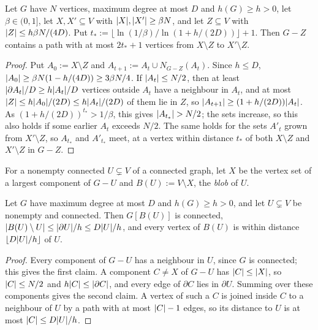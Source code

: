 \begin{lemma}\label{lem:connector}
Let $G$ have $N$ vertices, maximum degree at most $D$ and $h(G)\ge h>0$, let $\beta\in(0,1]$, let $X,X'\subseteq V$ with $\lvert X\rvert,\lvert X'\rvert\ge\beta N$, and let $Z\subseteq V$ with $\lvert Z\rvert\le h\beta N/(4D)$. Put $t_*:=\lfloor\ln(1/\beta)/\ln(1+h/(2D))\rfloor+1$. Then $G-Z$ contains a path with at most $2t_*+1$ vertices from $X\setminus Z$ to $X'\setminus Z$.
\end{lemma}

\begin{proof}
Put $A_0:=X\setminus Z$ and $A_{t+1}:=A_t\cup N_{G-Z}(A_t)$. Since $h\le D$, $\lvert A_0\rvert\ge\beta N(1-h/(4D))\ge3\beta N/4$. If $\lvert A_t\rvert\le N/2$, then at least $\lvert \partial A_t\rvert/D\ge h\lvert A_t\rvert/D$ vertices outside $A_t$ have a neighbour in $A_t$, and at most $\lvert Z\rvert\le h\lvert A_0\rvert/(2D)\le h\lvert A_t\rvert/(2D)$ of them lie in $Z$, so $\lvert A_{t+1}\rvert\ge(1+h/(2D))\lvert A_t\rvert$. As $(1+h/(2D))^{t_*}>1/\beta$, this gives $\lvert A_{t_*}\rvert>N/2$; the sets increase, so this also holds if some earlier $A_t$ exceeds $N/2$. The same holds for the sets $A'_t$ grown from $X'\setminus Z$, so $A_{t_*}$ and $A'_{t_*}$ meet, at a vertex within distance $t_*$ of both $X\setminus Z$ and $X'\setminus Z$ in $G-Z$.
\end{proof}

For a nonempty connected $U\subsetneq V$ of a connected graph, let $X$ be the vertex set of a largest component of $G-U$ and $B(U):=V\setminus X$, the \emph{blob} of $U$.

\begin{lemma}[blobs]\label{lem:blob}
Let $G$ have maximum degree at most $D$ and $h(G)\ge h>0$, and let $U\subsetneq V$ be nonempty and connected. Then $G[B(U)]$ is connected, $\lvert B(U)\setminus U\rvert\le\lvert \partial U\rvert/h\le D\lvert U\rvert/h$, and every vertex of $B(U)$ is within distance $\lfloor D\lvert U\rvert/h\rfloor$ of $U$.
\end{lemma}

\begin{proof}
Every component of $G-U$ has a neighbour in $U$, since $G$ is connected; this gives the first claim. A component $C\ne X$ of $G-U$ has $\lvert C\rvert\le\lvert X\rvert$, so $\lvert C\rvert\le N/2$ and $h\lvert C\rvert\le\lvert \partial C\rvert$, and every edge of $\partial C$ lies in $\partial U$. Summing over these components gives the second claim. A vertex of such a $C$ is joined inside $C$ to a neighbour of $U$ by a path with at most $\lvert C\rvert-1$ edges, so its distance to $U$ is at most $\lvert C\rvert\le D\lvert U\rvert/h$.
\end{proof}

